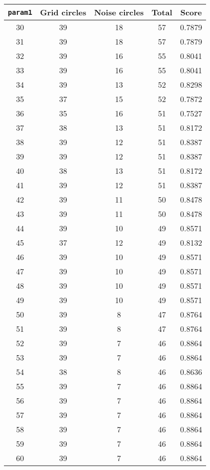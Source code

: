 \documentclass[letterpaper, 12pt]{article}
\begin{document}
\begin{longtable}{|c|c|c|c|c|}
\hline
\textbf{\texttt{param1}} & \textbf{Grid circles} & \textbf{Noise circles} & \textbf{Total} & \textbf{Score} \\
\hline
30 & 39 & 18 & 57 & 0.7879 \\
\hline
31 & 39 & 18 & 57 & 0.7879 \\
\hline
32 & 39 & 16 & 55 & 0.8041 \\
\hline
33 & 39 & 16 & 55 & 0.8041 \\
\hline
34 & 39 & 13 & 52 & 0.8298 \\
\hline
35 & 37 & 15 & 52 & 0.7872 \\
\hline
36 & 35 & 16 & 51 & 0.7527 \\
\hline
37 & 38 & 13 & 51 & 0.8172 \\
\hline
38 & 39 & 12 & 51 & 0.8387 \\
\hline
39 & 39 & 12 & 51 & 0.8387 \\
\hline
40 & 38 & 13 & 51 & 0.8172 \\
\hline
41 & 39 & 12 & 51 & 0.8387 \\
\hline
42 & 39 & 11 & 50 & 0.8478 \\
\hline
43 & 39 & 11 & 50 & 0.8478 \\
\hline
44 & 39 & 10 & 49 & 0.8571 \\
\hline
45 & 37 & 12 & 49 & 0.8132 \\
\hline
46 & 39 & 10 & 49 & 0.8571 \\
\hline
47 & 39 & 10 & 49 & 0.8571 \\
\hline
48 & 39 & 10 & 49 & 0.8571 \\
\hline
49 & 39 & 10 & 49 & 0.8571 \\
\hline
50 & 39 & 8 & 47 & 0.8764 \\
\hline
51 & 39 & 8 & 47 & 0.8764 \\
\hline
52 & 39 & 7 & 46 & 0.8864 \\
\hline
53 & 39 & 7 & 46 & 0.8864 \\
\hline
54 & 38 & 8 & 46 & 0.8636 \\
\hline
55 & 39 & 7 & 46 & 0.8864 \\
\hline
56 & 39 & 7 & 46 & 0.8864 \\
\hline
57 & 39 & 7 & 46 & 0.8864 \\
\hline
58 & 39 & 7 & 46 & 0.8864 \\
\hline
59 & 39 & 7 & 46 & 0.8864 \\
\hline
60 & 39 & 7 & 46 & 0.8864 \\

\end{longtable}
\end{document}
